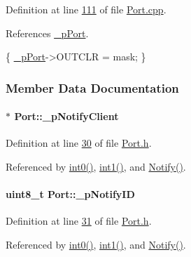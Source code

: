 Definition at line \hyperlink{_port_8cpp_source_l00111}{111} of file \hyperlink{_port_8cpp_source}{Port.cpp}.



References \hyperlink{_port_8h_source_l00029}{\_\-pPort}.


\begin{DoxyCode}
\{
    \hyperlink{class_port_a1475caa8ec2e667350eae96d4b7a28ac}{_pPort}->OUTCLR = mask;
\}
\end{DoxyCode}


\subsubsection{Member Data Documentation}
\hypertarget{class_port_ac939fdc751f6e01ce4afcdf97f4598f9}{
\paragraph[{\_\-pNotifyClient}]{$\ast$ {\bf Port::\_\-pNotifyClient}}\hfill}
\label{class_port_ac939fdc751f6e01ce4afcdf97f4598f9}


Definition at line \hyperlink{_port_8h_source_l00030}{30} of file \hyperlink{_port_8h_source}{Port.h}.



Referenced by \hyperlink{_port_8cpp_source_l00075}{int0()}, \hyperlink{_port_8cpp_source_l00083}{int1()}, and \hyperlink{_port_8cpp_source_l00069}{Notify()}.

\hypertarget{class_port_ac1dae0f3300d4fc57f16f8b548b0e9d7}{
\paragraph[{\_\-pNotifyID}]{\setlength{\rightskip}{0pt plus 5cm}uint8\_\-t {\bf Port::\_\-pNotifyID}}\hfill}
\label{class_port_ac1dae0f3300d4fc57f16f8b548b0e9d7}


Definition at line \hyperlink{_port_8h_source_l00031}{31} of file \hyperlink{_port_8h_source}{Port.h}.



Referenced by \hyperlink{_port_8cpp_source_l00075}{int0()}, \hyperlink{_port_8cpp_source_l00083}{int1()}, and \hyperlink{_port_8cpp_source_l00069}{Notify()}.


